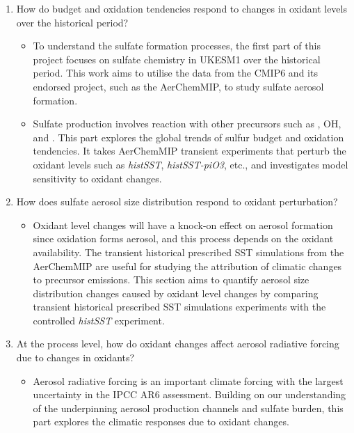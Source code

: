 \begin{enumerate}
    \item  How do  budget and oxidation tendencies respond to changes in oxidant levels over the historical period?
    \begin{itemize}
        \item To understand the sulfate formation processes, the first part of this project focuses on sulfate chemistry in UKESM1 over the historical period. This work aims to utilise the data from the CMIP6 and its endorsed project, such as the AerChemMIP, to study sulfate aerosol formation.  
        \item Sulfate production involves  reaction with other precursors such as , OH, and . This part explores the global trends of sulfur budget and oxidation tendencies. It takes AerChemMIP transient experiments that perturb the oxidant levels such as \textit{histSST}, \textit{histSST-piO3}, etc., and investigates model sensitivity to oxidant changes. 
    \end{itemize}

    \item How does sulfate aerosol size distribution respond to oxidant perturbation?

    \begin{itemize}
        \item Oxidant level changes will have a knock-on effect on aerosol formation since  oxidation forms aerosol, and this process depends on the oxidant availability. The transient historical prescribed SST simulations from the AerChemMIP are useful for studying the attribution of climatic changes to precursor emissions. This section aims to quantify aerosol size distribution changes caused by oxidant level changes by comparing transient historical prescribed SST simulations experiments with the controlled \textit{histSST} experiment. 
    \end{itemize}

    \item At the process level, how do oxidant changes affect aerosol radiative forcing due to changes in oxidants?

    \begin{itemize}
        \item Aerosol radiative forcing is an important climate forcing with the largest uncertainty in the IPCC AR6 assessment. Building on our understanding of the underpinning aerosol production channels and sulfate burden, this part explores the climatic responses due to oxidant changes. 
    \end{itemize}


\end{enumerate}
